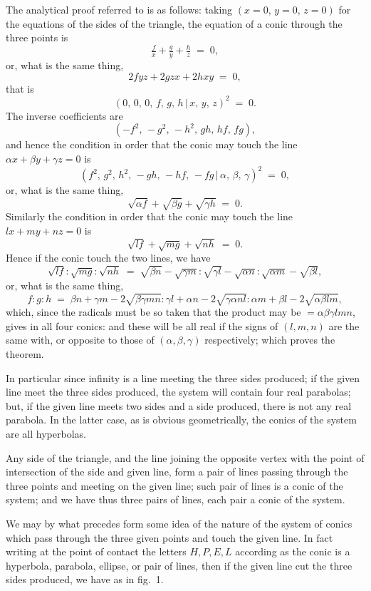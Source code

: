 \documentclass[11pt,a4paper]{article}
\providecommand{\mid}{\,|\,}
\begin{document}
The analytical proof referred to is as follows: taking $(x = 0,\,y = 0,\,z = 0)$ for the equations of the sides of the triangle, the equation of a conic through the three points is
\[
\tfrac{f}{x} + \tfrac{g}{y} + \tfrac{h}{z} \;=\; 0,
\]
or, what is the same thing,
\[
2fyz + 2gzx + 2hxy \;=\; 0,
\]
that is
\[
(0,\,0,\,0,\,f,\,g,\,h\mid x,\,y,\,z)^2 \;=\; 0.
\]
The inverse coefficients are
\[
(-f^2,\,-g^2,\,-h^2,\,gh,\,hf,\,fg),
\]
and hence the condition in order that the conic may touch the line $\alpha x + \beta y + \gamma z = 0$ is
\[
(f^2,\,g^2,\,h^2,\,-gh,\,-hf,\,-fg\mid \alpha,\,\beta,\,\gamma)^2 \;=\; 0,
\]
or, what is the same thing,
\[
\sqrt{\alpha f} + \sqrt{\beta g} + \sqrt{\gamma h} \;=\; 0.
\]
Similarly the condition in order that the conic may touch the line $lx + my + nz = 0$ is
\[
\sqrt{lf} + \sqrt{mg} + \sqrt{nh} \;=\; 0.
\]
Hence if the conic touch the two lines, we have
\[
\sqrt{lf} : \sqrt{mg} : \sqrt{nh} \;=\; \sqrt{\beta n} - \sqrt{\gamma m} : \sqrt{\gamma l} - \sqrt{\alpha n} : \sqrt{\alpha m} - \sqrt{\beta l},
\]
or, what is the same thing,
\[
f : g : h \;=\; \beta n + \gamma m - 2\sqrt{\beta\gamma m n} : \gamma l + \alpha n - 2\sqrt{\gamma\alpha n l} : \alpha m + \beta l - 2\sqrt{\alpha\beta l m},
\]
which, since the radicals must be so taken that the product may be $= \alpha\beta\gamma lmn$, gives in all four conics: and these will be all real if the signs of $(l,m,n)$ are the same with, or opposite to those of $(\alpha,\beta,\gamma)$ respectively; which proves the theorem.

\medskip

In particular since infinity is a line meeting the three sides produced; if the given line meet the three sides produced, the system will contain four real parabolas; but, if the given line meets two sides and a side produced, there is not any real parabola. In the latter case, as is obvious geometrically, the conics of the system are all hyperbolas.

\medskip

Any side of the triangle, and the line joining the opposite vertex with the point of intersection of the side and given line, form a pair of lines passing through the three points and meeting on the given line; such pair of lines is a conic of the system; and we have thus three pairs of lines, each pair a conic of the system.

\medskip

We may by what precedes form some idea of the nature of the system of conics which pass through the three given points and touch the given line. In fact writing at the point of contact the letters $H, P, E, L$ according as the conic is a hyperbola, parabola, ellipse, or pair of lines, then if the given line cut the three sides produced, we have as in fig.~1.
\end{document}
